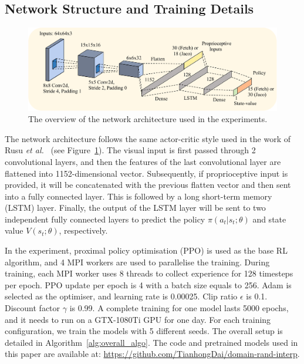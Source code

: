 \subsection{Network Structure and Training Details}
\begin{figure}[h!]
  \centering
  \includegraphics[width=\linewidth]{figures/chapter6/network-arch-td.pdf}
  \caption{The overview of the network architecture used in the experiments.}
  \label{fig:network}
\end{figure}
The network architecture follows the same actor-critic style used in the work of Rusu \textit{et al.}~\cite{rusu2017sim} (see Figure~\ref{fig:network}). The visual input is first passed through 2 convolutional layers, and then the features of the last convolutional layer are flattened into 1152-dimensional vector. Subsequently, if proprioceptive input is provided, it will be concatenated with the previous flatten vector and then sent into a fully connected layer. This is followed by a long short-term memory (LSTM) layer. Finally, the output of the LSTM layer will be sent to two independent fully connected layers to predict the policy $\pi(a_{t}|s_{t};\theta)$ and state value $V(s_{t};\theta)$, respectively. 

In the experiment, proximal policy optimisation (PPO) is used as the base RL algorithm, and 4 MPI workers are used to parallelise the training. During training, each MPI worker uses 8 threads to collect experience for 128 timesteps per epoch. PPO update per epoch is 4 with a batch size equals to 256. Adam is selected as the optimiser, and learning rate is 0.00025. Clip ratio $\epsilon$ is 0.1. Discount factor $\gamma$ is 0.99. A complete training for one model lasts 5000 epochs, and it needs to run on a GTX-1080Ti GPU for one day. For each training configuration, we train the models with 5 different seeds. The overall setup is detailed in Algorithm~\ref{alg:overall_algo}. The code and pretrained models used in this paper are available at: \url{https://github.com/TianhongDai/domain-rand-interp}.

